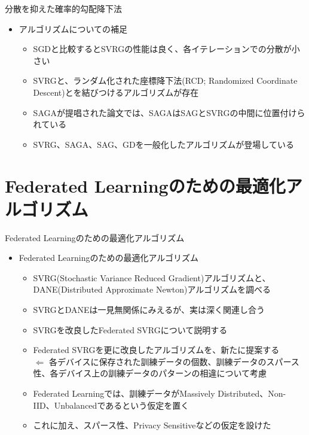 \documentclass[dvipdfmx,notheorems,t]{beamer}
\begin{document}
\begin{frame}{分散を抑えた確率的勾配降下法}

\begin{itemize}
	\item アルゴリズムについての補足
	\begin{itemize}
		\item SGDと比較するとSVRGの性能は良く、各イテレーションでの分散が小さい
		\newline
		
		\item SVRGと、ランダム化された座標降下法(RCD; Randomized Coordinate Descent)とを結びつけるアルゴリズムが存在
		\item SAGAが提唱された論文では、SAGAはSAGとSVRGの中間に位置付けられている
		\item SVRG、SAGA、SAG、GDを一般化したアルゴリズムが登場している
	\end{itemize}
\end{itemize}

\end{frame}

\section{Federated Learningのための最適化アルゴリズム}

\begin{frame}{Federated Learningのための最適化アルゴリズム}

\begin{itemize}
	\item Federated Learningのための最適化アルゴリズム
	\begin{itemize}
		\item \alert{SVRG}(Stochastic Variance Reduced Gradient)アルゴリズムと、\alert{DANE}(Distributed Approximate Newton)アルゴリズムを調べる
		\item SVRGとDANEは一見無関係にみえるが、実は深く関連し合う
		\newline
		
		\item SVRGを改良した\alert{Federated SVRG}について説明する
		\item Federated SVRGを更に改良したアルゴリズムを、新たに提案する \\
		$\Leftarrow$ 各デバイスに保存された訓練データの個数、訓練データのスパース性、各デバイス上の訓練データのパターンの相違について考慮
		\newline
		
		\item Federated Learningでは、訓練データが\alert{Massively Distributed}、\alert{Non-IID}、\alert{Unbalanced}であるという仮定を置く
		\item これに加え、\alert{スパース性}、\alert{Privacy Sensitive}などの仮定を設けた
	\end{itemize}
\end{itemize}

\end{frame}
\end{document}
